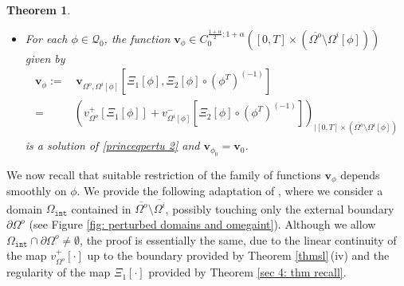 \documentclass[11pt,reqno,a4paper]{amsart}
\theoremstyle{plain}
\newtheorem{theorem}{Theorem}[section]
\theoremstyle{definition}
\begin{document}
\begin{theorem}
\begin{itemize}
    \item[(v)] For each $\phi \in \mathcal{Q}_0$, the function $\mathbf{v}_\phi \in C_{0}^{\frac{1+\alpha}{2}; 1+\alpha}([0,T] \times (\overline{\Omega^o} \setminus \Omega^i[\phi] ))$ given by
    \begin{equation*}
    \begin{aligned}
        \mathbf{v}_{\phi} :=& \,\mathbf{v}_{\Omega^o,\Omega^i[\phi]}\left[\Xi_1[\phi],\Xi_2[\phi]\circ (\phi^T)^{(-1)}\right]
        \\
        =&\left( v^+_{\Omega^o} [\Xi_1[\phi]] + v^-_{\Omega^i[\phi]}
        \left[\Xi_2[\phi]\circ (\phi^T)^{(-1)}\right] \right)_{| [0,T] \times (\overline{\Omega^o} \setminus {\Omega^i[\phi]})}
    \end{aligned}
    \end{equation*}
    is a solution of \eqref{princeqpertu 2} and $\mathbf{v}_{\phi_0}= \mathbf{v}_0$.
    \end{itemize}
\end{theorem}

We now recall that suitable restriction of the family of functions $\mathbf{v}_\phi$ depends smoothly on $\phi$. We provide the following adaptation of \cite[Thm.\,5]{DaLuMoMu24.2}, where we consider a domain $\Omega_{\mathtt{int}}$ contained in $\overline{\Omega^o} \setminus \overline{\Omega^i}$, possibly touching only the external boundary $\partial\Omega^o$ (see Figure \ref{fig: perturbed domains and omegaint}). Although we allow $\Omega_\mathtt{int} \cap \partial\Omega^o \neq \emptyset$, the proof is essentially the same, due to the linear continuity of the map $v^+_{\Omega^o}[\cdot]$ up to the boundary provided by Theorem \ref{thmsl}\,(iv) and the regularity of the map $\Xi_1[\cdot]$ provided by Theorem \ref{sec 4: thm recall}. 
\end{document}
